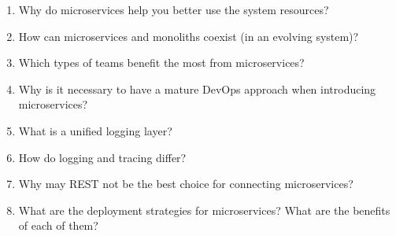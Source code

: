 \begin{enumerate}
\item
Why do microservices help you better use the system resources?

\item
How can microservices and monoliths coexist (in an evolving system)?

\item
Which types of teams benefit the most from microservices?

\item
Why is it necessary to have a mature DevOps approach when introducing microservices?

\item
What is a unified logging layer?

\item
How do logging and tracing differ?

\item
Why may REST not be the best choice for connecting microservices?

\item
What are the deployment strategies for microservices? What are the benefits of each of them?
\end{enumerate}